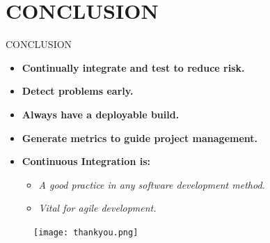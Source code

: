 \documentclass{beamer}
\begin{document}
\section{CONCLUSION}
\begin{frame}{CONCLUSION}
\begin{itemize}
\vspace{10pt}
\item  \textbf{Continually integrate and test to reduce risk.}
\vspace{10pt}
\item  \textbf{Detect problems early.}
\vspace{10pt}
\item  \textbf{Always have a deployable build.}
\vspace{10pt}
\item  \textbf{Generate metrics to guide project management.}
\vspace{10pt}
\item   \textbf{Continuous Integration is:}
\begin{itemize}
\vspace{10pt}
\item \textit{A good practice in any software development method.}
\vspace{10pt}
\item \textit{Vital for agile development.}
\end{itemize}
\end{itemize}
\end{frame}

\begin{frame}
\begin{figure}
\begin{center}
\texttt{[image: thankyou.png]}
\end{center}
\end{figure}
\end{frame}






\end{document}
